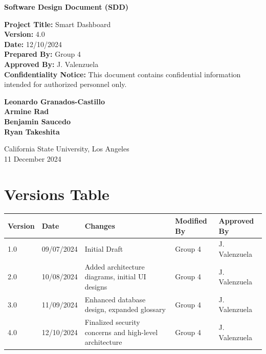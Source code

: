 \documentclass[12pt]{article}
\begin{document}
\begin{titlepage}
   \begin{center}
       \vspace*{1cm}

       \textbf{Software Design Document (SDD)}
        \author{Group 4}
        \date{12/10/2024}
        
        \textbf{Project Title:} Smart Dashboard \\
        \textbf{Version:} 4.0 \\
        \textbf{Date:} 12/10/2024 \\
        \textbf{Prepared By:} Group 4 \\
        \textbf{Approved By:} J. Valenzuela \\
        \textbf{Confidentiality Notice:} This document contains confidential information intended for authorized personnel only.
            
       \vspace{1.5cm}

       \textbf{Leonardo Granados-Castillo\\Armine Rad\\Benjamin Saucedo\\Ryan Takeshita}

       \vfill
            
            
       \vspace{0.8cm}

       California State University, Los Angeles\\
       11 December 2024
            
   \end{center}
\end{titlepage}

\newpage

\tableofcontents

\newpage

\section{Versions Table}
\begin{tabular}{|l|l|p{5cm}|l|l|}
\hline
\textbf{Version} & \textbf{Date} & \textbf{Changes} & \textbf{Modified By} & \textbf{Approved By} \\ \hline
1.0 & 09/07/2024 & Initial Draft & Group 4 & J. Valenzuela \\ \hline
2.0 & 10/08/2024 & Added architecture diagrams, initial UI designs & Group 4 & J. Valenzuela \\ \hline
3.0 & 11/09/2024 & Enhanced database design, expanded glossary & Group 4 & J. Valenzuela \\ \hline
4.0 & 12/10/2024 & Finalized security concerns and high-level architecture & Group 4 & J. Valenzuela \\ \hline
\end{tabular}
\end{document}
